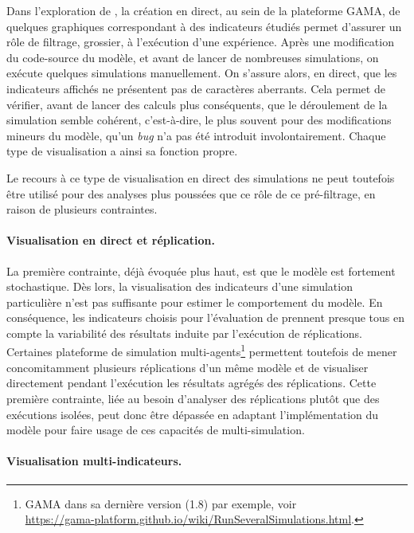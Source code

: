 Dans l'exploration de \simfeodal{}, la création en direct, au sein de la plateforme GAMA, de quelques graphiques correspondant à des indicateurs étudiés permet d'assurer un rôle de filtrage, grossier, à l'exécution d'une expérience.
Après une modification du code-source du modèle, et avant de lancer de nombreuses simulations, on exécute quelques simulations \og manuellement\fg{}.
On s'assure alors, en direct, que les indicateurs affichés ne présentent pas de caractères aberrants.
Cela permet de vérifier, avant de lancer des calculs plus conséquents, que le déroulement de la simulation semble cohérent, c'est-à-dire, le plus souvent pour des modifications mineurs du modèle, qu'un \textit{bug} n'a pas été introduit involontairement.
Chaque type de visualisation a ainsi sa fonction propre.

Le recours à ce type de visualisation en direct des simulations ne peut toutefois être utilisé pour des analyses plus poussées que ce rôle de ce pré-filtrage, en raison de plusieurs contraintes.

\paragraph{Visualisation en direct et réplication.}

La première contrainte, déjà évoquée plus haut, est que le modèle \simfeodal{} est fortement stochastique.
Dès lors, la visualisation des indicateurs d'une simulation particulière n'est pas suffisante pour estimer le comportement du modèle.
En conséquence, les indicateurs choisis pour l'évaluation de \simfeodal{} prennent presque tous en compte la variabilité des résultats induite par l'exécution de réplications.
Certaines plateforme de simulation multi-agents\footnote{
	GAMA dans sa dernière version (1.8) par exemple, voir\\ \href{https://gama-platform.github.io/wiki/RunSeveralSimulations.html}{https://gama-platform.github.io/wiki/RunSeveralSimulations.html}.
} permettent toutefois de mener concomitamment plusieurs réplications d'un même modèle et de visualiser directement pendant l'exécution les résultats agrégés des réplications.
Cette première contrainte, liée au besoin d'analyser des réplications plutôt que des exécutions isolées, peut donc être dépassée en adaptant l'implémentation du modèle pour faire usage de ces capacités de multi-simulation.

\paragraph{Visualisation multi-indicateurs.}

